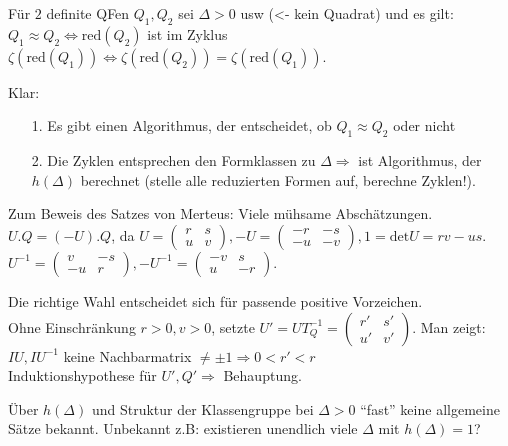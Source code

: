 \documentclass[a4paper,twoside,DIV15,BCOR12mm]{scrbook}
\begin{document}
\begin{folgerung}
Für $2$ definite QFen $Q_1, Q_2$ sei $\Delta > 0$ usw (<- kein Quadrat) und es gilt:\\
$Q_1 \approx Q_2 \Leftrightarrow \text{red}(Q_2)$ ist im Zyklus $\zeta(\text{red}(Q_1)) \Leftrightarrow \zeta(\text{red}(Q_2)) = \zeta(\text{red}(Q_1))$.
\end{folgerung}

Klar:
\begin{itemize}
\item[1.] Es gibt einen Algorithmus, der entscheidet, ob $Q_1 \approx Q_2$ oder nicht
\item[2.] Die Zyklen entsprechen den Formklassen zu $\Delta \Rightarrow$ ist Algorithmus, der $h(\Delta)$ berechnet (stelle alle reduzierten Formen auf, berechne Zyklen!).
\end{itemize}

Zum Beweis des Satzes von Merteus: Viele mühsame Abschätzungen.\\

$U.Q = (-U).Q$, da $U = \begin{pmatrix}r & s\\u & v\end{pmatrix}, -U = \begin{pmatrix}-r & -s\\-u & -v\end{pmatrix}, 1 = \text{det}U =rv - us$. $U^{-1} = \begin{pmatrix}v & -s\\-u & r\end{pmatrix}, -U^{-1} = \begin{pmatrix}-v & s\\u & -r\end{pmatrix}$.

Die richtige Wahl entscheidet sich für passende positive Vorzeichen.\\
Ohne Einschränkung $r > 0, v > 0$, setzte $U' = UT_Q^{-1} = \begin{pmatrix}r' & s'\\u' & v'\end{pmatrix}$. Man zeigt: $IU, IU^{-1}$ keine Nachbarmatrix $\not= \pm 1 \Rightarrow 0 < r' < r$\\
Induktionshypothese für $U', Q' \Rightarrow$ Behauptung.

Über $h(\Delta)$ und Struktur der Klassengruppe bei $\Delta > 0$ "`fast"' keine allgemeine Sätze bekannt. Unbekannt z.B: existieren unendlich viele $\Delta$ mit $h(\Delta) = 1$?
\end{document}
